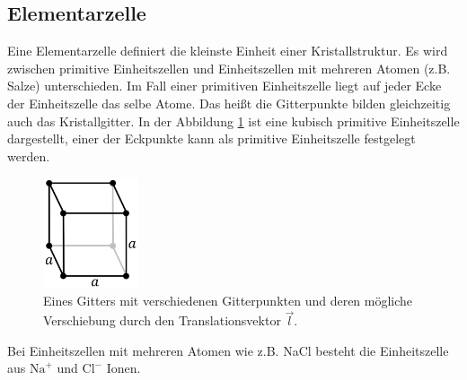 \subsection{Elementarzelle}
Eine Elementarzelle definiert die kleinste Einheit einer Kristallstruktur.
Es wird zwischen primitive Einheitszellen und Einheitszellen mit mehreren Atomen
(z.B. Salze) unterschieden. Im Fall einer primitiven Einheitszelle
liegt auf jeder Ecke der Einheitszelle das selbe Atome. Das heißt die Gitterpunkte
bilden gleichzeitig auch das Kristallgitter. In der Abbildung \ref{primitiv} ist
eine kubisch primitive Einheitszelle dargestellt, einer der Eckpunkte kann
als primitive Einheitszelle festgelegt werden.

\begin{figure}
    \centering
    \includegraphics[width=0.25\textwidth]{ressources/primitiv.png}
    \caption{Eines Gitters mit verschiedenen Gitterpunkten und deren mögliche
    Verschiebung durch den Translationsvektor $\vec l$.}
    \label{primitiv}
\end{figure}


Bei Einheitszellen
mit mehreren Atomen wie z.B. NaCl besteht die Einheitszelle aus $\text{Na}^+$
und $\text{Cl}^-$ Ionen.
